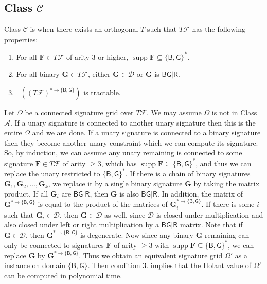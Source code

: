 \documentclass[11pt]{article}
\DeclareMathOperator{\holbs}{Holant^*_2}
\DeclareMathOperator{\supp}{supp}
\newcommand{\db}{\mathsf{B}}
\newcommand{\dg}{\mathsf{G}}
\newcommand{\dr}{\mathsf{R}}
\newcommand{\domres}[1]{
  ^{*\to\{#1\}}
}
\newcommand{\tractbinary}{$\mathscr{A}$\xspace}
\newcommand{\tractBG}{$\mathscr{C}$\xspace}
\begin{document}
\subsection{Class \texorpdfstring{\tractBG}{C}}
Class \tractBG is when there exists an orthogonal $T$ such that $T \mathcal{F}$ has the following properties:
\begin{enumerate}
        \item For all $\mathbf{F} \in T \mathcal{F}$ of arity $3$ or higher, $\supp \mathbf{F} \subseteq \{\db, \dg\}^*$.
        \item For all binary $\mathbf{G} \in T \mathcal{F}$, either $\mathbf{G} \in \mathcal{D}$ or $\mathbf{G}$ is $\db \dg | \dr$.
        \item $\holbs((T\mathcal{F})\domres{\db, \dg})$ is tractable.
      \end{enumerate}
Let $\Omega$ be a connected signature grid 
over $T \mathcal{F}$. We may assume  $\Omega$
is not in Class \tractbinary.
If a unary signature is connected to another unary
signature then this is the entire  $\Omega$ 
and we are done. If a unary signature is connected to a binary
signature then they  become another unary constraint which we can compute
its signature. So, by induction, 
we can assume any unary remaining is connected to
some signature 
$\mathbf{F} \in T \mathcal{F}$ of arity $\ge 3$, which has 
$\supp \mathbf{F} \subseteq \{\db, \dg\}^*$, and thus we can replace the
unary restricted to $\{\db, \dg\}^*$.
If there is a  chain of binary signatures $\mathbf{G}_1, \mathbf{G}_2, \ldots, \mathbf{G}_k$, we replace  it by a single binary signature $\mathbf{G}$ by taking the matrix product. If all $\mathbf{G}_i$ are $\db \dg | \dr$, then $\mathbf{G}$ is also $\db \dg | \dr$. In addition, the matrix of $\mathbf{G}\domres{\db, \dg}$ is equal to the product of the matrices of $\mathbf{G}_i\domres{\db, \dg}$.
If there is some $i$ such that $\mathbf{G}_i \in \mathcal{D}$, then $\mathbf{G} \in \mathcal{D}$ as well, since $\mathcal{D}$ is closed under multiplication and also closed under left or right multiplication by a $\db \dg | \dr$ matrix.
Note that if $\mathbf{G} \in \mathcal{D}$, then $\mathbf{G} \domres{\db, \dg}$ is degenerate. Now since any binary  $\mathbf{G}$ remaining can only be connected to
signatures $\mathbf{F}$ of arity $\ge 3$ with 
$\supp \mathbf{F} \subseteq \{\db, \dg\}^*$,
we can replace  $\mathbf{G}$ by  $\mathbf{G} \domres{\db, \dg}$.
Thus we obtain an equivalent signature grid 
$\Omega'$ as a $\holbs$ instance on domain $\{\db, \dg\}$.
Then condition 3. implies that  the Holant value of $\Omega'$ can be computed in polynomial time.
\end{document}
